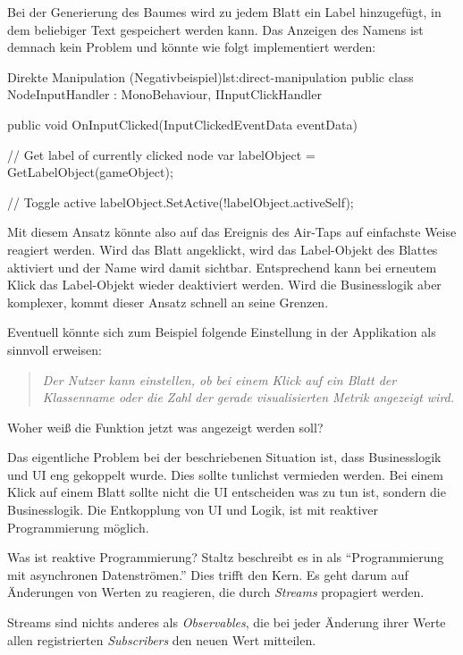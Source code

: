 Bei der Generierung des Baumes wird zu jedem Blatt ein Label hinzugefügt, in dem beliebiger Text gespeichert werden kann. Das Anzeigen des Namens ist demnach kein Problem und könnte wie folgt implementiert werden:

\begin{codesnippet}{Direkte Manipulation (Negativbeispiel)}{lst:direct-manipulation}
public class NodeInputHandler : MonoBehaviour, IInputClickHandler
{
    public void OnInputClicked(InputClickedEventData eventData)
    {
        // Get label of currently clicked node
        var labelObject = GetLabelObject(gameObject);

        // Toggle active
        labelObject.SetActive(!labelObject.activeSelf);
    }
}
\end{codesnippet}

Mit diesem Ansatz könnte also auf das Ereignis des Air-Taps auf einfachste Weise reagiert werden. Wird das Blatt angeklickt, wird das Label-Objekt des Blattes aktiviert und der Name wird damit sichtbar. Entsprechend kann bei erneutem Klick das Label-Objekt wieder deaktiviert werden. Wird die Businesslogik aber komplexer, kommt dieser Ansatz schnell an seine Grenzen.

Eventuell könnte sich zum Beispiel folgende Einstellung in der Applikation als sinnvoll erweisen:

\begin{quotation}
  \textit{Der Nutzer kann einstellen, ob bei einem Klick auf ein Blatt der Klassenname oder die Zahl der gerade visualisierten Metrik angezeigt wird.}
\end{quotation}

Woher weiß die Funktion jetzt was angezeigt werden soll?

Das eigentliche Problem bei der beschriebenen Situation ist, dass Businesslogik und UI eng gekoppelt wurde. Dies sollte tunlichst vermieden werden. Bei einem Klick auf einem Blatt sollte nicht die UI entscheiden was zu tun ist, sondern die Businesslogik. Die Entkopplung von UI und Logik, ist mit reaktiver Programmierung möglich.

Was ist reaktive Programmierung? Staltz beschreibt es in \cite{staltz2016introduction} als "`Programmierung mit asynchronen Datenströmen."' Dies trifft den Kern. Es geht darum auf Änderungen von Werten zu reagieren, die durch \textit{Streams} propagiert werden.

Streams sind nichts anderes als \textit{Observables}, die bei jeder Änderung ihrer Werte allen registrierten \textit{Subscribers} den neuen Wert mitteilen.

